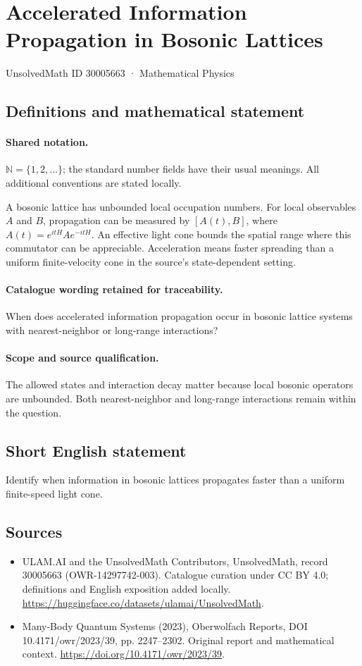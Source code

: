 \documentclass[11pt]{article}
\begin{document}
\setcounter{section}{30005662}
\section{Accelerated Information Propagation in Bosonic Lattices}\label{30005663}
{\small UnsolvedMath ID 30005663 · Mathematical Physics}
\subsection{Definitions and mathematical statement}

\paragraph{Shared notation.}$\mathbb N=\{1,2,\ldots\}$; the standard number fields have their usual meanings. All additional conventions are stated locally.


A bosonic lattice has unbounded local occupation numbers. For local observables $A$ and $B$, propagation can be measured by $[A(t),B]$, where $A(t)=e^{itH}Ae^{-itH}$. An effective light cone bounds the spatial range where this commutator can be appreciable. Acceleration means faster spreading than a uniform finite-velocity cone in the source's state-dependent setting.

\paragraph{Catalogue wording retained for traceability.}
When does accelerated information propagation occur in bosonic lattice systems with nearest-neighbor or long-range interactions?

\paragraph{Scope and source qualification.}The allowed states and interaction decay matter because local bosonic operators are unbounded. Both nearest-neighbor and long-range interactions remain within the question.
\subsection{Short English statement}
Identify when information in bosonic lattices propagates faster than a uniform finite-speed light cone.
\subsection{Sources}
\begin{itemize}
\item[\hypertarget{source:30005663:1}{S1}] ULAM.AI and the UnsolvedMath Contributors, UnsolvedMath, record 30005663 (OWR-14297742-003). Catalogue curation under CC BY 4.0; definitions and English exposition added locally.
\url{https://huggingface.co/datasets/ulamai/UnsolvedMath}.
\item[\hypertarget{source:30005663:2}{S2}] Many-Body Quantum Systems (2023), Oberwolfach Reports, DOI 10.4171/owr/2023/39, pp. 2247--2302. Original report and mathematical context.
\url{https://doi.org/10.4171/owr/2023/39}.
\end{itemize}
\label{end:30005663}
\end{document}
